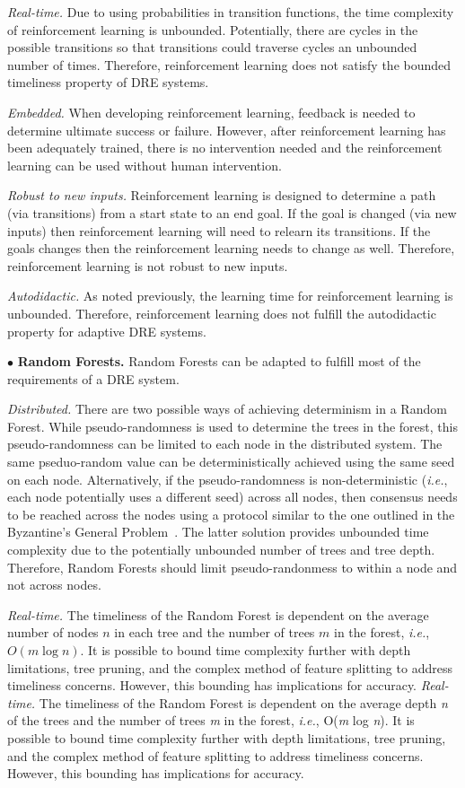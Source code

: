 \documentclass[conference]{IEEEtran}
\begin{document}
\emph{Real-time.} Due to using probabilities in transition functions, the time complexity of reinforcement learning is unbounded. Potentially, there are cycles in the possible transitions so that transitions could traverse cycles an unbounded number of times. Therefore, reinforcement learning does not satisfy the bounded timeliness property of DRE systems.

\emph{Embedded.} When developing reinforcement learning, feedback is needed to determine ultimate success or failure. However, after reinforcement learning has been adequately trained, there is no intervention needed and the reinforcement learning can be used without human intervention.

\emph{Robust to new inputs.} Reinforcement learning is designed to determine a path (via transitions) from a start state to an end goal. If the goal is changed (via new inputs) then reinforcement learning will need to relearn its transitions. If the goals changes then the reinforcement learning needs to change as well. Therefore, reinforcement learning is not robust to new inputs.

\emph{Autodidactic.} As noted previously, the learning time for reinforcement learning is unbounded. Therefore, reinforcement learning does not fulfill the autodidactic property for adaptive DRE systems.


$\bullet$ {\bf Random Forests.}
Random Forests can be adapted to fulfill most of the requirements of a DRE system.

\emph{Distributed.} There are two possible ways of achieving determinism in a Random Forest. While pseudo-randomness is used to determine the trees in the forest, this pseudo-randomness can be limited to each node in the distributed system. The same pseduo-random value can be deterministically achieved using the same seed on each node. Alternatively, if the pseudo-randomness is non-deterministic (\emph{i.e.}, each node potentially uses a different seed) across all nodes, then consensus needs to be reached across the nodes using a protocol similar to the one outlined in the Byzantine's General Problem~\cite{Lamport:82}. The latter solution provides unbounded time complexity due to the potentially unbounded number of trees and tree depth. Therefore, Random Forests should limit pseudo-randonmess to within a node and not across nodes.

\emph{Real-time.} The timeliness of the Random Forest is dependent on the average number of nodes $n$ in each tree and the number of trees $m$ in the forest, \emph{i.e.}, $O(m \log n)$\cite{Lin:06}. It is possible to bound time complexity further with depth limitations, tree pruning, and the complex method of feature splitting\cite{Ho:95} to address timeliness concerns. However, this bounding has implications for accuracy.
\emph{Real-time.} The timeliness of the Random Forest is dependent on the average depth \emph{n} of the trees and the number of trees \emph{m} in the forest, \emph{i.e.}, O(\emph{m} log \emph{n})\cite{Lin:06}. It is possible to bound time complexity further with depth limitations, tree pruning, and the complex method of feature splitting\cite{Ho:95} to address timeliness concerns. However, this bounding has implications for accuracy.
\end{document}
